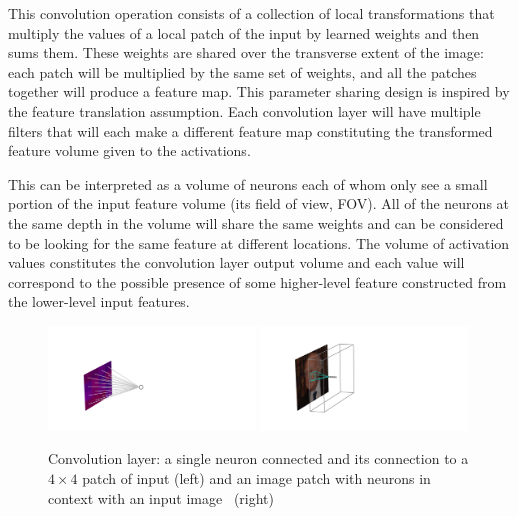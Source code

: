 This convolution operation consists of a collection of local transformations that multiply the values of a local patch of the input by learned weights and then sums them. These weights are shared over the transverse extent of the image: each patch will be multiplied by the same set of weights, and all the patches together will produce a feature map. This parameter sharing design is inspired by the feature translation assumption. Each convolution layer will have multiple filters that will each make a different feature map constituting the transformed feature volume given to the activations.


This can be interpreted as a volume of neurons each of whom only see a small portion of the input feature volume (its field of view, FOV). All of the neurons at the same depth in the volume will share the same weights and can be considered to be looking for the same feature at different locations. The volume of activation values constitutes the convolution layer output volume and each value will correspond to the possible presence of some higher-level feature constructed from the lower-level input features. 

\begin{figure}[h!]
    \begin{center}
        \includegraphics[width=0.49\textwidth]{figures/machine_learning/convolution_neuron.pdf}
        \includegraphics[width=0.49\textwidth]{figures/machine_learning/convolution_layer.pdf}
    \end{center}
    \caption{Convolution layer: a single neuron connected and its connection to a $4\times{}4$ patch of input (left) and an image patch with neurons in context with an input image~\cite{Higgs_photo} (right)}
        \label{fig:machine_learning:convolution}
\end{figure}

